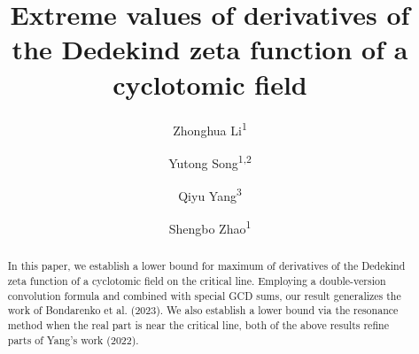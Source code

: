 \documentclass[12pt,reqno]{amsart}
\theoremstyle{definition}
\numberwithin{equation}{section}
\begin{document}
	
	
	\baselineskip=17pt
	
	
	
	\title[Extreme values of derivatives of the Dedekind zeta function of a cyclotomic field]{Extreme values of derivatives of the Dedekind zeta function of a cyclotomic field}

    \author{Zhonghua Li\textsuperscript{1}}
    \author{Yutong Song\textsuperscript{1,2}}
    \author{Qiyu Yang\textsuperscript{3}}
    \author{Shengbo Zhao\textsuperscript{1}}
    \address{1.School of Mathematical Sciences, Key Laboratory of Intelligent Computing and Applications(Ministry of Education), Tongji University, Shanghai 200092, P. R. China}
    \address{2.Graz University of Technology, Institute of Analysis and Number Theory, Steyrergasse 30/II, 8010 Graz, Austria}
    \address{3.School of Mathematics and Statistics, Henan Normal University, Xinxiang 453007, CHINA}


	
	\begin{abstract} 
	    In this paper, we establish a lower bound for maximum of derivatives of the Dedekind zeta function of a cyclotomic field on the critical line. Employing a double-version convolution formula and combined with special GCD sums, our result generalizes the work of Bondarenko et al. (2023). We also establish a lower bound via the resonance method when the real part is near the critical line, both of the above results refine parts of Yang's work (2022).  
	\end{abstract}
	
	
	
	\maketitle
\end{document}
